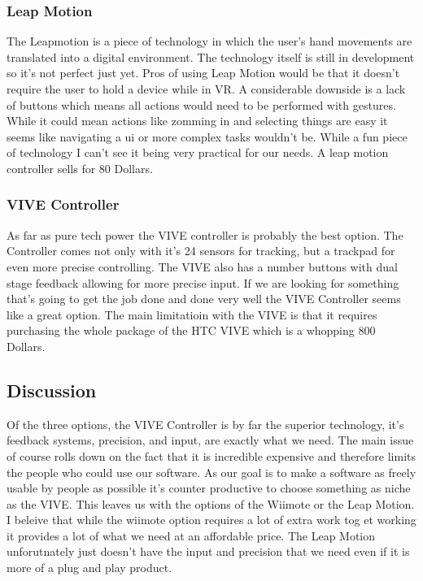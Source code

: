 \subsubsection{Leap Motion}
The Leapmotion is a piece of technology in which the user's hand movements are translated into a digital environment. 
The technology itself is still in development so it's not perfect just yet.
Pros of using Leap Motion would be that it doesn't require the user to hold a device while in VR.
A considerable downside is a lack of buttons which means all actions would need to be performed with gestures. 
While it could mean actions like zomming in and selecting things are easy it seems like navigating a ui or more complex tasks wouldn't be.
While a fun piece of technology I can't see it being very practical for our needs.
A leap motion controller sells for 80 Dollars.

\subsubsection{VIVE Controller}
As far as pure tech power the VIVE controller is probably the best option. 
The Controller comes not only with it's 24 sensors for tracking, but a trackpad for even more precise controlling.
The VIVE also has a number buttons with dual stage feedback allowing for more precise input.
If we are looking for something that's going to get the job done and done very well the VIVE Controller seems like a great option.
The main limitatioin with the VIVE is that it requires purchasing the whole package of the HTC VIVE which is a whopping 800 Dollars.

\subsection{Discussion}
Of the three options, the VIVE Controller is by far the superior technology, it's feedback systems, precision, and input, are exactly what we need.
The main issue of course rolls down on the fact that it is incredible expensive and therefore limits the people who could use our software.
As our goal is to make a software as freely usable by people as possible it's counter productive to choose something as niche as the VIVE.
This leaves us with the options of the Wiimote or the Leap Motion.
I beleive that while the wiimote option requires a lot of extra work tog et working it provides a lot of what we need at an affordable price.
The Leap Motion unforutnately just doesn't have the input and precision that we need even if it is more of a plug and play product.

